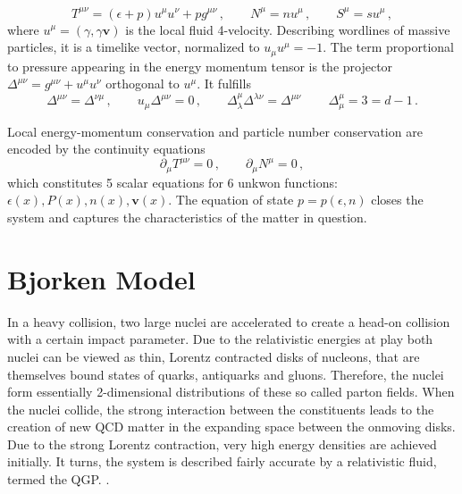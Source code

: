 \begin{equation}
        T^{\mu\nu}=(\epsilon+p)u^\mu u^\nu+pg^{\mu\nu}\,,\qquad
        N^\mu       =nu^\mu\,,\qquad
        S^\mu       =su^\mu\,,
    \end{equation}
where $u^\mu=(\gamma,\gamma\mathbf{v})$ is the local fluid 4-velocity. Describing wordlines of massive particles, it is a timelike vector, normalized to ${u_\mu u^\mu=-1}$. The term proportional to pressure appearing in the energy momentum tensor is the projector ${\Delta^{\mu\nu}=g^{\mu\nu}+u^\mu u^\nu}$ orthogonal to $u^\mu$. It fulfills
\begin{equation}
    \Delta^{\mu\nu}=\Delta^{\nu\mu}\,,\qquad u_\mu\Delta^{\mu\nu}=0\,,\qquad\Delta^\mu_\lambda\Delta^{\lambda\nu}=\Delta^{\mu\nu}\,\qquad\Delta^\mu_\mu=3=d-1\,.
    \label{eq:FluidMechanics_ProjProperties}
\end{equation}

Local energy-momentum conservation and particle number conservation are encoded by the continuity equations
    \begin{equation}
        \partial_\mu T^{\mu\nu}  =0\,,\qquad
        \partial_\mu N^\mu       =0\,,
    \end{equation}
which constitutes 5 scalar equations for 6 unkwon functions: $\epsilon(x), P(x), n(x), \mathbf{v}(x)$. The equation of state $p=p(\epsilon,n)$ closes the system and captures the characteristics of the matter in question.



\section{Bjorken Model}

In a heavy collision, two large nuclei are accelerated to create a head-on collision with a certain impact parameter. Due to the relativistic energies at play both nuclei can be viewed as thin, Lorentz contracted disks of nucleons, that are themselves bound states of quarks, antiquarks and gluons. Therefore, the nuclei form essentially 2-dimensional distributions of these so called parton fields. When the nuclei collide, the strong interaction between the constituents leads to the creation of new QCD matter in the expanding space between the onmoving disks. Due to the strong Lorentz contraction, very high energy densities are achieved initially. It turns, the system is described fairly accurate by a relativistic fluid, termed the QGP. .


